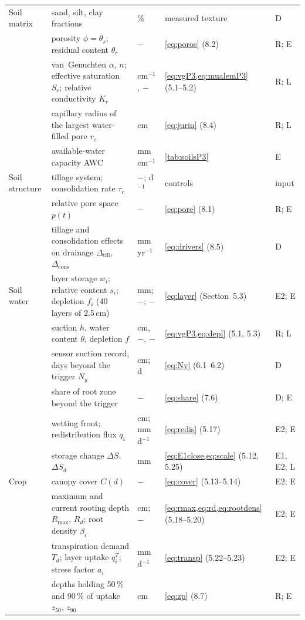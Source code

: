 \documentclass[preprint,12pt]{elsarticle}
\begin{document}
{\begin{longtable}{>{\raggedright\arraybackslash}p{2.3cm}>{\raggedright\arraybackslash}p{3.8cm}>{\raggedright\arraybackslash}p{1.8cm}>{\raggedright\arraybackslash}p{4.0cm}>{\raggedright\arraybackslash}p{1.9cm}}
Soil matrix & sand, silt, clay fractions & \% & measured texture & D\\
 & porosity $\phi=\theta_s$; residual content $\theta_r$ & $-$ & \cref{eq:poros} (8.2) & R; E\\
 & van~Genuchten $\alpha$, $n$; effective saturation $S_e$; relative conductivity $K_r$ & cm$^{-1}$, $-$ & \cref{eq:vgP3,eq:mualemP3} (5.1--5.2) & R; L\\
 & capillary radius of the largest water-filled pore $r_c$ & cm & \cref{eq:jurin} (8.4) & R; L\\
 & available-water capacity AWC & mm\,cm$^{-1}$ & \cref{tab:soilsP3} & E\\
Soil structure & tillage system; consolidation rate $\tau_c$ & $-$; d$^{-1}$ & controls & input\\
 & relative pore space $p(t)$ & $-$ & \cref{eq:pore} (8.1) & R; E\\
 & tillage and consolidation effects on drainage $\Delta_{\mathrm{till}}$, $\Delta_{\mathrm{cons}}$ & mm\,yr$^{-1}$ & \cref{eq:drivers} (8.5) & D\\
Soil water & layer storage $w_i$; relative content $s_i$; depletion $f_i$ (40 layers of 2.5\,cm) & mm; $-$; $-$ & \cref{eq:layer} (Section~5.3) & E2; E\\
 & suction $h$, water content $\theta$, depletion $f$ & cm, $-$, $-$ & \cref{eq:vgP3,eq:depl} (5.1, 5.3) & R; L\\
 & sensor suction record, days beyond the trigger $N_y$ & cm; d & \cref{eq:Ny} (6.1--6.2) & D\\
 & share of root zone beyond the trigger & $-$ & \cref{eq:share} (7.6) & D; E\\
 & wetting front; redistribution flux $q_i$ & cm; mm\,d$^{-1}$ & \cref{eq:redis} (5.17) & E2; E\\
 & storage change $\Delta S$, $\Delta S_d$ & mm & \cref{eq:E1close,eq:scale} (5.12, 5.25) & E1, E2; L\\
Crop & canopy cover $C(d)$ & $-$ & \cref{eq:cover} (5.13--5.14) & E2; E\\
 & maximum and current rooting depth $R_{\max}$, $R_d$; root density $\beta_i$ & cm; $-$ & \cref{eq:rmax,eq:rd,eq:rootdens} (5.18--5.20) & E2; E\\
 & transpiration demand $T_d$; layer uptake $q_i^{T}$; stress factor $a_i$ & mm\,d$^{-1}$ & \cref{eq:transp} (5.22--5.23) & E2; E\\
 & depths holding 50\,\% and 90\,\% of uptake $z_{50}$, $z_{90}$ & cm & \cref{eq:zp} (8.7) & R; E\\

\end{longtable}}
\end{document}
